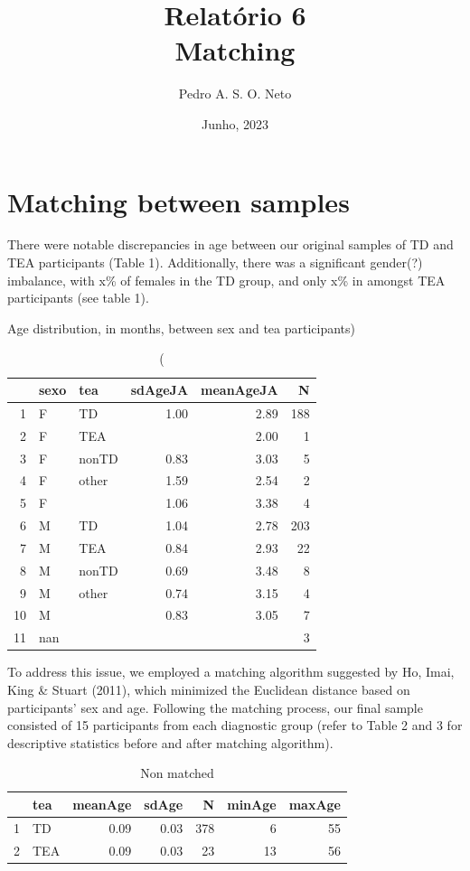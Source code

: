 \documentclass{article}
\title{Relatório 6 \\ Matching}
\author{Pedro A. S. O. Neto}
\date{Junho, 2023}
\begin{document}
\maketitle

\section{Matching between samples}

There were notable discrepancies in age between our original samples of TD and TEA participants (Table 1). Additionally, there was a significant gender(?) imbalance, with x\% of females in the TD group, and only x\% in amongst TEA participants (see table 1).

\begin{table}[ht]
\caption(Age distribution, in months, between sex and tea participants)
\centering
\begin{tabular}{rllrrr}
  \hline
 & sexo & tea & sdAgeJA & meanAgeJA & N \\ 
  \hline
1 & F & TD & 1.00 & 2.89 & 188 \\ 
  2 & F & TEA &  & 2.00 &   1 \\ 
  3 & F & nonTD & 0.83 & 3.03 &   5 \\ 
  4 & F & other & 1.59 & 2.54 &   2 \\ 
  5 & F &  & 1.06 & 3.38 &   4 \\ 
  6 & M & TD & 1.04 & 2.78 & 203 \\ 
  7 & M & TEA & 0.84 & 2.93 &  22 \\ 
  8 & M & nonTD & 0.69 & 3.48 &   8 \\ 
  9 & M & other & 0.74 & 3.15 &   4 \\ 
  10 & M &  & 0.83 & 3.05 &   7 \\ 
  11 & nan &  &  &  &   3 \\ 
   \hline
\end{tabular}
\end{table}

To address this issue, we employed a matching algorithm suggested by Ho, Imai, King \& Stuart (2011), which minimized the Euclidean distance based on participants' sex and age. Following the matching process, our final sample consisted of 15 participants from each diagnostic group (refer to Table 2 and 3 for descriptive statistics before and after matching algorithm).

\begin{table}[ht]
\caption{Non matched}
\centering
\begin{tabular}{rlrrrrr}
  \hline
 & tea & meanAge & sdAge & N & minAge & maxAge \\ 
  \hline
1 & TD & 0.09 & 0.03 & 378 &   6 &  55 \\ 
  2 & TEA & 0.09 & 0.03 &  23 &  13 &  56 \\ 
   \hline
\end{tabular}
\end{table}
\end{document}
